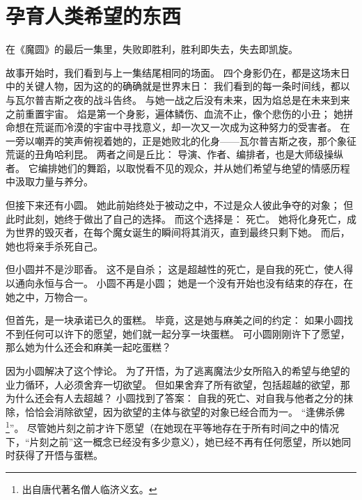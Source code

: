 \chapter[孕育人类希望的东西]{孕育人类希望的东西}



在《魔圆》的最后一集里，失败即胜利，胜利即失去，失去即凯旋。

故事开始时，我们看到与上一集结尾相同的场面。
四个身影仍在，都是这场末日中的关键人物，因为这的的确确就是世界末日：
我们看到的每一条时间线，都以与瓦尔普吉斯之夜的战斗告终。
与她一战之后没有未来，因为焰总是在未来到来之前重置宇宙。
焰是第一个身影，遍体鳞伤、血流不止，像个悲伤的小丑；
她拼命想在荒诞而冷漠的宇宙中寻找意义，却一次又一次成为这种努力的受害者。
在一旁以嘲弄的笑声俯视着她的，正是她败北的化身——瓦尔普吉斯之夜，那个象征荒诞的丑角哈利昆。
两者之间是丘比：
导演、作者、编排者，也是大师级操纵者。
它编排她们的舞蹈，以取悦看不见的观众，并从她们希望与绝望的情感历程中汲取力量与养分。

但接下来还有小圆。
她此前始终处于被动之中，不过是众人彼此争夺的对象；
但此时此刻，她终于做出了自己的选择。
而这个选择是：
死亡。
她将化身死亡，成为世界的毁灭者，在每个魔女诞生的瞬间将其消灭，直到最终只剩下她。
而后，她也将亲手杀死自己。

但小圆并不是沙耶香。
这不是自杀；
这是超越性的死亡，是自我的死亡，使人得以通向永恒与合一\cite{ref62}。
小圆不再是小圆；
她是一个没有开始也没有结束的存在，在她之中，万物合一。

但首先，是一块承诺已久的蛋糕。
毕竟，这是她与麻美之间的约定：
如果小圆找不到任何可以许下的愿望，她们就一起分享一块蛋糕。
可小圆刚刚许下了愿望，那么她为什么还会和麻美一起吃蛋糕？

因为小圆解决了这个悖论。
为了开悟，为了逃离魔法少女所陷入的希望与绝望的业力循环，人必须舍弃一切欲望。
但如果舍弃了所有欲望，包括超越的欲望，那为什么还会有人去超越？
小圆找到了答案：
自我的死亡、对自我与他者之分的抹除，恰恰会消除欲望，因为欲望的主体与欲望的对象已经合而为一。
“逢佛杀佛\footnote{%
    出自唐代著名僧人临济义玄。
}\cite{ref71}”。
尽管她片刻之前才许下愿望（在她现在平等地存在于所有时间之中的情况下，“片刻之前”这一概念已经没有多少意义），她已经不再有任何愿望，所以她同时获得了开悟与蛋糕。


